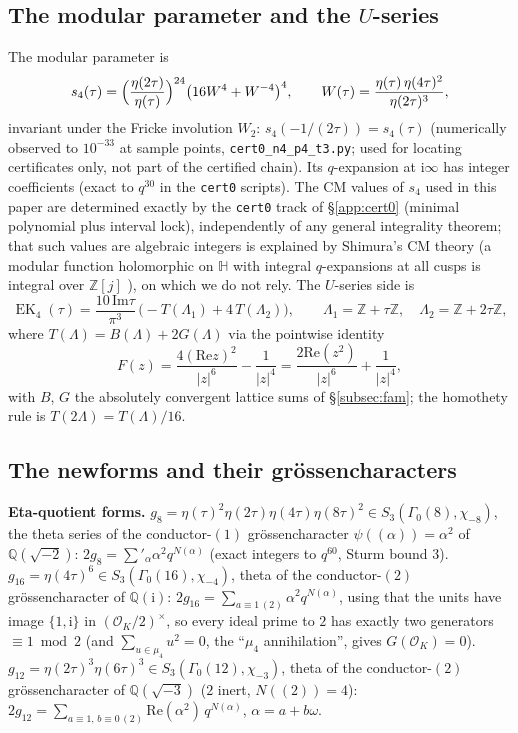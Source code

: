 \documentclass[11pt]{article}
\newcommand{\Qq}{\mathbb{Q}}
\newcommand{\Zz}{\mathbb{Z}}
\newcommand{\Hh}{\mathbb{H}}
\newcommand{\ii}{\mathrm{i}}
\newcommand{\OO}{\mathcal{O}}
\newcommand{\ReT}{\mathrm{Re}}
\newcommand{\ImT}{\mathrm{Im}}
\DeclareMathOperator{\EK}{EK}
\theoremstyle{definition}
\theoremstyle{remark}
\begin{document}
\subsection{The modular parameter and the \texorpdfstring{$U$}{U}-series}
\label{app:s4}

The modular parameter is
\[
  s_4(\tau)=\Bigl(\frac{\eta(2\tau)}{\eta(\tau)}\Bigr)^{24}
            \bigl(16W^4+W^{-4}\bigr)^4,
  \qquad
  W(\tau)=\frac{\eta(\tau)\,\eta(4\tau)^2}{\eta(2\tau)^3},
\]
invariant under the Fricke involution $W_2$:
$s_4(-1/(2\tau))=s_4(\tau)$ (numerically observed to $10^{-33}$ at
sample points, \texttt{cert0\_n4\_p4\_t3.py}; used for locating
certificates only, not part of the certified chain). Its
$q$-expansion at $\ii\infty$ has integer coefficients (exact to
$q^{30}$ in the \texttt{cert0} scripts). The CM values of $s_4$
used in this paper are determined exactly by the \texttt{cert0}
track of \S\ref{app:cert0} (minimal polynomial plus interval
lock), independently of any general integrality theorem; that such
values are algebraic integers is explained by Shimura's CM theory
(a modular function holomorphic on $\Hh$ with integral
$q$-expansions at all cusps is integral over $\Zz[j]$
\cite[\S11]{Cox}), on which we do not rely.
The $U$-series side is
\[
  \EK_4(\tau)=\frac{10\,\ImT\tau}{\pi^3}\,
  \bigl(-T(\Lambda_1)+4\,T(\Lambda_2)\bigr),\qquad
  \Lambda_1=\Zz+\tau\Zz,\quad \Lambda_2=\Zz+2\tau\Zz,
\]
where $T(\Lambda)=B(\Lambda)+2G(\Lambda)$ via the pointwise identity
\[
  F(z)=\frac{4(\ReT z)^2}{|z|^6}-\frac1{|z|^4}
      =\frac{2\ReT(z^2)}{|z|^6}+\frac1{|z|^4},
\]
with $B$, $G$ the absolutely convergent lattice sums of
\S\ref{subsec:fam}; the homothety rule is $T(2\Lambda)=T(\Lambda)/16$.

\subsection{The newforms and their grössencharacters}\label{app:newforms}

\textbf{Eta-quotient forms.}
$g_8=\eta(\tau)^2\eta(2\tau)\eta(4\tau)\eta(8\tau)^2\in
S_3(\Gamma_0(8),\chi_{-8})$, the theta series of the conductor-$(1)$
grössencharacter $\psi((\alpha))=\alpha^2$ of $\Qq(\sqrt{-2})$:
$2g_8=\sum'_{\alpha}\alpha^2q^{N(\alpha)}$ (exact integers to $q^{60}$,
Sturm bound $3$).
$g_{16}=\eta(4\tau)^6\in S_3(\Gamma_0(16),\chi_{-4})$, theta of the
conductor-$(2)$ grössencharacter of $\Qq(\ii)$:
$2g_{16}=\sum_{a\equiv1\,(2)}\alpha^2q^{N(\alpha)}$, using that the
units have image $\{1,\ii\}$ in $(\OO_K/2)^\times$, so every ideal
prime to $2$ has exactly two generators $\equiv1\bmod2$ (and
$\sum_{u\in\mu_4}u^2=0$, the ``$\mu_4$ annihilation'', gives
$G(\OO_K)=0$).
$g_{12}=\eta(2\tau)^3\eta(6\tau)^3\in S_3(\Gamma_0(12),\chi_{-3})$,
theta of the conductor-$(2)$ grössencharacter of $\Qq(\sqrt{-3})$
($2$ inert, $N((2))=4$): $2g_{12}=\sum_{a\equiv1,\,b\equiv0\,(2)}
\ReT(\alpha^2)\,q^{N(\alpha)}$, $\alpha=a+b\omega$.
\end{document}
